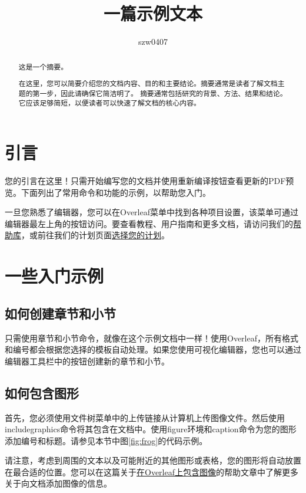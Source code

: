 \documentclass{article}
\title{一篇示例文本}
\author{szw0407}
\begin{document}
\maketitle

\begin{abstract}
这是一个摘要。

在这里，您可以简要介绍您的文档内容、目的和主要结论。摘要通常是读者了解文档主题的第一步，因此请确保它简洁明了。
摘要通常包括研究的背景、方法、结果和结论。它应该足够简短，以便读者可以快速了解文档的核心内容。
\end{abstract}
\tableofcontents
\newpage
\section{引言}

您的引言在这里！只需开始编写您的文档并使用重新编译按钮查看更新的PDF预览。下面列出了常用命令和功能的示例，以帮助您入门。

一旦您熟悉了编辑器，您可以在Overleaf菜单中找到各种项目设置，该菜单可通过编辑器最左上角的按钮访问。要查看教程、用户指南和更多文档，请访问我们的\href{https://www.overleaf.com/learn}{帮助库}，或前往我们的计划页面\href{https://www.overleaf.com/user/subscription/plans}{选择您的计划}。

\section{一些入门示例}

\subsection{如何创建章节和小节}

只需使用章节和小节命令，就像在这个示例文档中一样！使用Overleaf，所有格式和编号都会根据您选择的模板自动处理。如果您使用可视化编辑器，您也可以通过编辑器工具栏中的按钮创建新的章节和小节。

\subsection{如何包含图形}

首先，您必须使用文件树菜单中的上传链接从计算机上传图像文件。然后使用includegraphics命令将其包含在文档中。使用figure环境和caption命令为您的图形添加编号和标题。请参见本节中图\ref{fig:frog}的代码示例。

请注意，考虑到周围的文本以及可能附近的其他图形或表格，您的图形将自动放置在最合适的位置。您可以在这篇关于\href{https://www.overleaf.com/learn/how-to/Including_images_on_Overleaf}{在Overleaf上包含图像}的帮助文章中了解更多关于向文档添加图像的信息。
\end{document}
